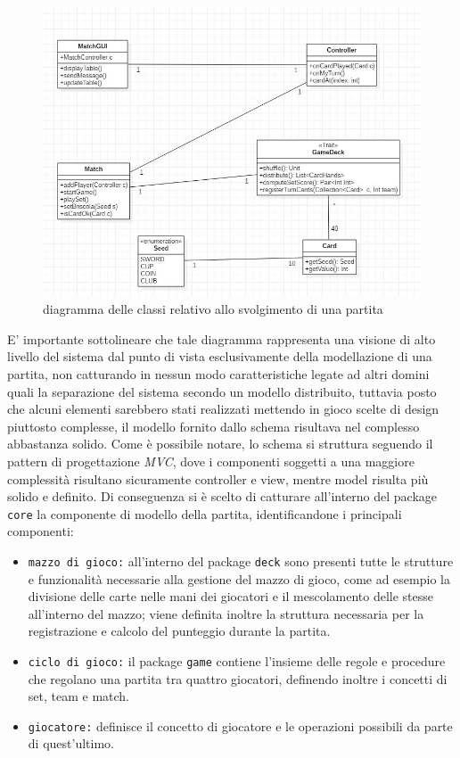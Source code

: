      \begin{figure}[H]
       \includegraphics[width=\textwidth,height=\textheight,keepaspectratio]{initialArchitecture}
        \caption{diagramma delle classi relativo allo svolgimento di una partita}
     \end{figure}

      E' importante sottolineare che tale diagramma rappresenta una visione di alto livello del sistema dal punto di vista esclusivamente della modellazione di una partita, non catturando in nessun modo caratteristiche legate ad altri domini quali la separazione del sistema secondo un modello distribuito, tuttavia posto che alcuni elementi sarebbero stati realizzati mettendo in gioco scelte di design piuttosto complesse, il modello fornito dallo schema risultava nel complesso abbastanza solido.
      Come è possibile notare, lo schema si struttura seguendo il pattern di progettazione \textit{MVC}, dove i componenti soggetti a una maggiore complessità risultano sicuramente controller e view, mentre model risulta più solido e definito.
      Di conseguenza si è scelto di catturare all'interno del package \texttt{core} la componente di modello della partita, identificandone i principali componenti:

     \begin{itemize}
       \item{\texttt{mazzo di gioco:}} all'interno del package \texttt{deck} sono presenti tutte le strutture e funzionalità necessarie alla gestione del mazzo di gioco, come ad esempio la divisione delle carte nelle mani dei giocatori e il mescolamento delle stesse all'interno del mazzo; viene definita inoltre la struttura necessaria per la registrazione e calcolo del punteggio durante la partita.


       \item{\texttt{ciclo di gioco:}} il package \texttt{game} contiene l'insieme delle regole e procedure che regolano una partita tra quattro giocatori, definendo inoltre i concetti di set, team e match.

       \item{\texttt{giocatore:}} definisce il concetto di giocatore e le operazioni possibili da parte di quest'ultimo.

     \end{itemize}

